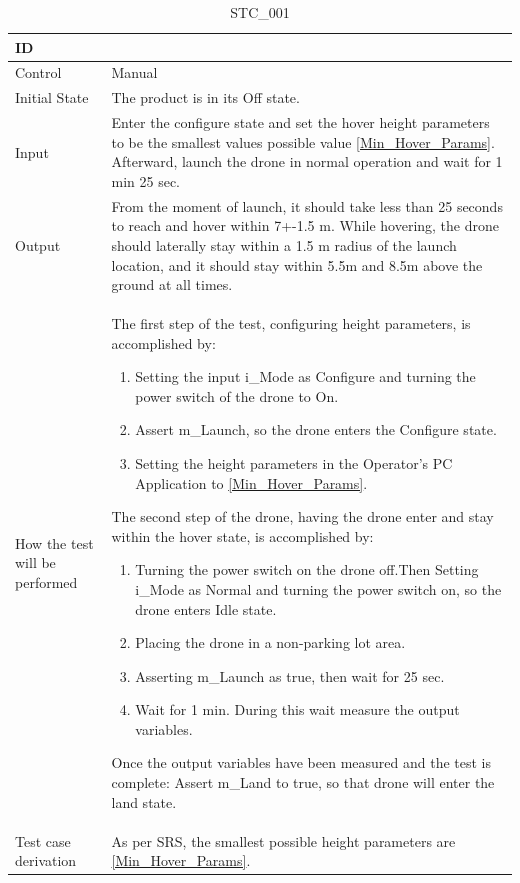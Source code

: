 \documentclass[12pt, titlepage]{article}
\begin{document}
\begin{table}[!h]
\begin{center}
\caption {STC\_001}
\label{tab:STC_001}
\begin{tabular}{ | m{1.5cm} | m{15cm} | } 
\hline
ID & \nameref{tab:STC_001} \\ 
\hline
Control & Manual \\ 
\hline
Initial State & The product is in its Off state. \\ 
\hline
Input & Enter the configure state and set the hover height parameters to be the smallest values possible value \ref{Min_Hover_Params}. Afterward, launch the drone in normal operation and wait for 1 min 25 sec. \\ 
\hline
Output & From the moment of launch, it should take less than 25 seconds to reach and hover within 7+-1.5 m. While hovering, the drone should laterally stay within a 1.5 m radius of the launch location, and it should stay within 5.5m and 8.5m above the ground at all times. \\ 
\hline
How the test will be performed & 
The first step of the test, configuring height parameters, is accomplished by:
\begin{enumerate}[topsep=0pt,itemsep=-1ex,partopsep=1ex,parsep=1ex]
    \item Setting the input i\_Mode as Configure and turning the power switch of the drone to On.
    \item Assert m\_Launch, so the drone enters the Configure state.
    \item Setting the height parameters in the Operator's PC Application to \ref{Min_Hover_Params}.
\end{enumerate}
The second step of the drone, having the drone enter and stay within the hover state, is accomplished by:
\begin{enumerate}[topsep=0pt,itemsep=-1ex,partopsep=1ex,parsep=1ex]
	\item Turning the power switch on the drone off.Then Setting i\_Mode as Normal and turning the power switch on, so the drone enters  Idle state.
	\item Placing the drone in a non-parking lot area. 
	\item Asserting m\_Launch as true, then wait for 25 sec.
	\item Wait for 1 min. During this wait measure the output variables.
\end{enumerate}
Once the output variables have been measured and the test is complete:
Assert m_Land to true, so that drone will enter the land state.\\ 
\hline
Test case derivation & As per SRS, the smallest possible height parameters are \ref{Min_Hover_Params}. 


\end{tabular}
\end{center}
\end{table}
\end{document}
